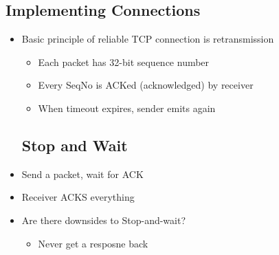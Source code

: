 \subsection{Implementing Connections}
\begin{itemize}
	\item Basic principle of reliable TCP connection is retransmission
	\begin{itemize}
		\item Each packet has 32-bit sequence number
		\item Every SeqNo is ACKed (acknowledged) by receiver
		\item When timeout expires, sender emits again
	\end{itemize}
	\subsection{Stop and Wait}
	\item Send a packet, wait for ACK
	\item Receiver ACKS everything
	\item Are there downsides to Stop-and-wait?
	\begin{itemize}
		\item Never get a resposne back
	\end{itemize}
\end{itemize}

